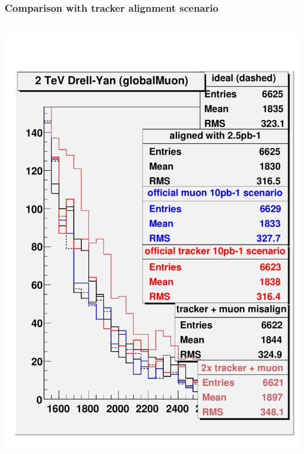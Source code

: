 \documentclass[compress]{beamer}
\begin{document}
\begin{frame}
\frametitle{Comparison with tracker alignment scenario}
\begin{columns}
\includegraphics[width=\linewidth]{trackercompare_dy_1000.pdf}

\end{columns}
\end{frame}
\end{document}
